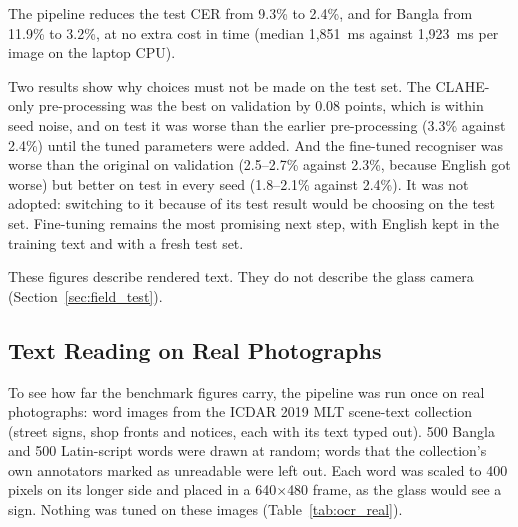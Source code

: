 The pipeline reduces the test CER from 9.3\% to 2.4\%, and for Bangla from 11.9\% to 3.2\%, at no extra cost in time (median 1,851~ms against 1,923~ms per image on the laptop CPU).

Two results show why choices must not be made on the test set. The CLAHE-only pre-processing was the best on validation by 0.08 points, which is within seed noise, and on test it was worse than the earlier pre-processing (3.3\% against 2.4\%) until the tuned parameters were added. And the fine-tuned recogniser was worse than the original on validation (2.5--2.7\% against 2.3\%, because English got worse) but better on test in every seed (1.8--2.1\% against 2.4\%). It was not adopted: switching to it because of its test result would be choosing on the test set. Fine-tuning remains the most promising next step, with English kept in the training text and with a fresh test set.

These figures describe rendered text. They do not describe the glass camera (Section~\ref{sec:field_test}).

\subsection{Text Reading on Real Photographs}
\label{sec:ocr_real}
To see how far the benchmark figures carry, the pipeline was run once on real photographs: word images from the ICDAR 2019 MLT scene-text collection \cite{mlt2019} (street signs, shop fronts and notices, each with its text typed out). 500 Bangla and 500 Latin-script words were drawn at random; words that the collection's own annotators marked as unreadable were left out. Each word was scaled to 400 pixels on its longer side and placed in a 640$\times$480 frame, as the glass would see a sign. Nothing was tuned on these images (Table~\ref{tab:ocr_real}).

